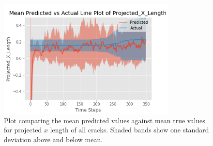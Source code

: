 \begin{figure}[!htb]
\centering
\includegraphics[width=0.8\textwidth]{images/Projected_X_Length_mean_variance_compare_ylim_test}
\caption{Plot comparing the mean predicted values against mean true values for projected $x$ length of all cracks. Shaded bands show one standard deviation above and below mean.}
\label{fig:mean_proj_x_length}
\end{figure}


\fi